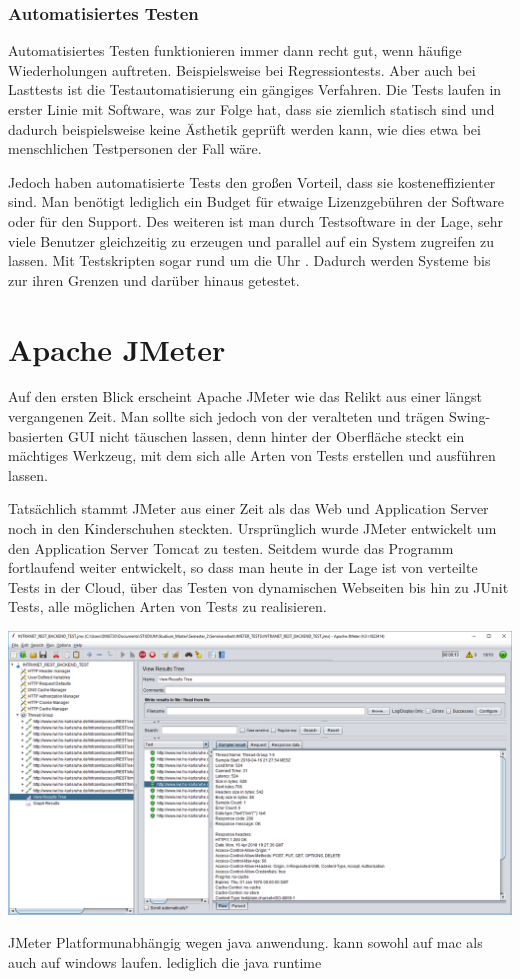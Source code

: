 \documentclass[a4paper,12pt]{article}
\begin{document}
\subsubsection{Automatisiertes Testen}
Automatisiertes Testen funktionieren immer dann recht gut, wenn häufige Wiederholungen auftreten. Beispielsweise bei Regressiontests. Aber auch bei Lasttests ist die Testautomatisierung ein gängiges Verfahren. Die Tests laufen in erster Linie mit Software, was zur Folge hat, dass sie ziemlich statisch sind und dadurch beispielsweise keine Ästhetik geprüft werden kann, wie dies etwa bei menschlichen Testpersonen der Fall wäre.

Jedoch haben automatisierte Tests den großen Vorteil, dass sie kosteneffizienter sind. Man benötigt lediglich ein Budget für etwaige Lizenzgebühren der Software oder für den Support. Des weiteren ist man durch Testsoftware in der Lage, sehr viele Benutzer gleichzeitig zu erzeugen und parallel auf ein System zugreifen zu lassen. Mit Testskripten sogar rund um die Uhr \cite{online:Testautomatisierung}. Dadurch werden Systeme bis zur ihren Grenzen und darüber hinaus getestet.

\section{Apache JMeter}
Auf den ersten Blick erscheint Apache JMeter wie das Relikt aus einer längst vergangenen Zeit. Man sollte sich jedoch von der veralteten und trägen Swing-basierten GUI nicht täuschen lassen, denn hinter der Oberfläche steckt ein mächtiges Werkzeug, mit dem sich alle Arten von Tests erstellen und ausführen lassen. \cite{online:heiseJMeterOderGatling}

Tatsächlich stammt JMeter aus einer Zeit als das Web und Application Server noch in den Kinderschuhen steckten. Ursprünglich wurde JMeter entwickelt um den Application Server Tomcat zu testen. Seitdem wurde das Programm fortlaufend weiter entwickelt, so dass man heute in der Lage ist von verteilte Tests in der Cloud, über das Testen von dynamischen Webseiten bis hin zu JUnit Tests, alle möglichen Arten von Tests zu realisieren. \cite{online:ApacheJMeter}

 
\includegraphics[width=1\textwidth]{bilder/jmeter_1.png}\par\vspace{1cm}
JMeter Platformunabhängig wegen java anwendung. kann sowohl auf mac als auch auf windows laufen. lediglich die java runtime
\end{document}
